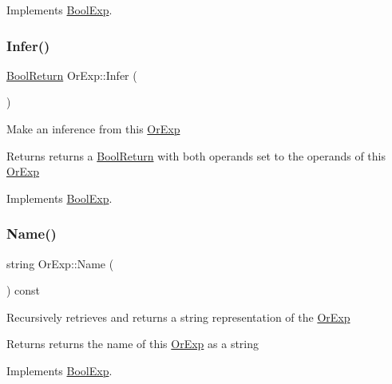 Implements \mbox{\hyperlink{classBoolExp_a591fb5f9cb849e0f56e596406a9a10d0}{Bool\+Exp}}.

\mbox{\label{classOrExp_aa3b98be68c00bc0c43a9eec5a47cdec9}} 
\subsubsection{\texorpdfstring{Infer()}{Infer()}}
{\footnotesize\ttfamily \mbox{\hyperlink{structBoolReturn}{Bool\+Return}} Or\+Exp\+::\+Infer (\begin{DoxyParamCaption}{ }\end{DoxyParamCaption})\hspace{0.3cm}{\ttfamily [virtual]}}

Make an inference from this \mbox{\hyperlink{classOrExp}{Or\+Exp}} \begin{DoxyReturn}{Returns}
returns a \mbox{\hyperlink{structBoolReturn}{Bool\+Return}} with both operands set to the operands of this \mbox{\hyperlink{classOrExp}{Or\+Exp}} 
\end{DoxyReturn}


Implements \mbox{\hyperlink{classBoolExp_a0e5d4a241332ae72d083645e4b71e0e6}{Bool\+Exp}}.

\mbox{\label{classOrExp_a8e535ae2da801bf5a4e8c9fbf3426a8b}} 
\subsubsection{\texorpdfstring{Name()}{Name()}}
{\footnotesize\ttfamily string Or\+Exp\+::\+Name (\begin{DoxyParamCaption}{ }\end{DoxyParamCaption}) const\hspace{0.3cm}{\ttfamily [virtual]}}

Recursively retrieves and returns a string representation of the \mbox{\hyperlink{classOrExp}{Or\+Exp}} \begin{DoxyReturn}{Returns}
returns the name of this \mbox{\hyperlink{classOrExp}{Or\+Exp}} as a string 
\end{DoxyReturn}


Implements \mbox{\hyperlink{classBoolExp_a3fdb64a9b8fd54e33d755ff4a577d11a}{Bool\+Exp}}.

\mbox{\label{classOrExp_a256171f2cf3d3165745d6df9390d9ab7}} 

